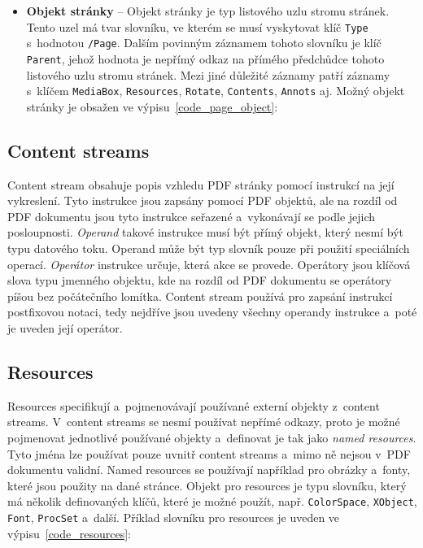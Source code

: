 \begin{itemize}
    \item \textbf{Objekt stránky} -- Objekt stránky je typ listového uzlu stromu
    stránek. Tento uzel má tvar slovníku, ve kterém se musí vyskytovat klíč
    \texttt{Type} s~hodnotou \texttt{/Page}. Dalším povinným záznamem tohoto
    slovníku je klíč \texttt{Parent}, jehož hodnota je nepřímý odkaz na přímého
    předchůdce tohoto listového uzlu stromu stránek. Mezi jiné důležité záznamy
    patří záznamy s~klíčem \texttt{MediaBox}, \texttt{Resources}, \texttt{Rotate},
    \texttt{Contents}, \texttt{Annots} aj.
    Možný objekt stránky je obsažen ve výpisu~\ref{code_page_object}:
\end{itemize}


\subsection*{Content streams} \label{content_streams}
Content stream obsahuje popis vzhledu PDF stránky pomocí instrukcí na její
vykreslení. Tyto instrukce jsou zapsány pomocí PDF objektů, ale na rozdíl od
PDF dokumentu jsou tyto instrukce seřazené a~vykonávají se podle jejich
posloupnosti. \emph{Operand} takové instrukce musí být přímý objekt, který 
nesmí být typu datového toku. Operand může být typ slovník pouze při použití
speciálních operací. \emph{Operátor} instrukce určuje, která akce se provede.
Operátory jsou klíčová slova typu jmenného objektu, kde na rozdíl od PDF dokumentu
se operátory píšou bez počátečního lomítka. Content stream používá pro zapsání
instrukcí postfixovou notaci, tedy nejdříve jsou uvedeny všechny operandy instrukce
a~poté je uveden její operátor.


\subsection*{Resources} \label{resources}
Resources specifikují a~pojmenovávají používané externí objekty z~content streams.
V~content streams se nesmí používat nepřímé odkazy, proto je možné pojmenovat
jednotlivé používané objekty a~definovat je tak jako \emph{named resources}.
Tyto jména lze používat pouze uvnitř content streams a~mimo ně nejsou v~PDF
dokumentu validní. Named resources se používají například pro obrázky a~fonty,
které jsou použity na dané stránce. Objekt pro resources je typu slovníku, který
má několik definovaných klíčů, které je možné použít, např. \texttt{ColorSpace}, 
\texttt{XObject}, \texttt{Font}, \texttt{ProcSet} a~další. Příklad slovníku pro
resources je uveden ve výpisu~\ref{code_resources}:



